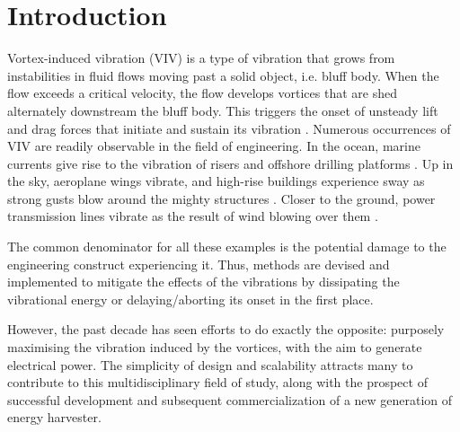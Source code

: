 \documentclass[oneside]{utmthesis}
\begin{document}
\tableofcontents
\listoftables
\listoffigures


\listofabbre
{}


\listofsymbols
{}


\listofappendices


\mainmatter


\chapter{Introduction} \label{chap:introduction}
Vortex-induced vibration (VIV) is a type of vibration that grows from instabilities in fluid flows moving past a solid object, i.e. bluff body. When the flow exceeds a critical velocity, the flow develops vortices that are shed alternately downstream the bluff body. This triggers the onset of unsteady lift and drag forces that initiate and sustain its vibration \citep{Bukka2020}. Numerous occurrences of VIV are readily observable in the field of engineering. In the ocean, marine currents give rise to the vibration of risers and offshore drilling platforms \citep{Liu2020,Zhang2020,Meng2020}. Up in the sky, aeroplane wings vibrate, and high-rise buildings experience sway as strong gusts blow around the mighty structures \citep{Arul2020,Hao2020,Gao2020}. Closer to the ground, power transmission lines vibrate as the result of wind blowing over them \citep{Wang2019,Gomez-Ortega2019}.

The common denominator for all these examples is the potential damage to the engineering construct experiencing it. Thus, methods are devised and implemented to mitigate the effects of the vibrations by dissipating the vibrational energy or delaying/aborting its onset in the first place.

However, the past decade has seen efforts to do exactly the opposite: purposely maximising the vibration induced by the vortices, with the aim to generate electrical power. The simplicity of design and scalability attracts many to contribute to this multidisciplinary field of study, along with the prospect of successful development and subsequent commercialization of a new generation of energy harvester.
\end{document}
